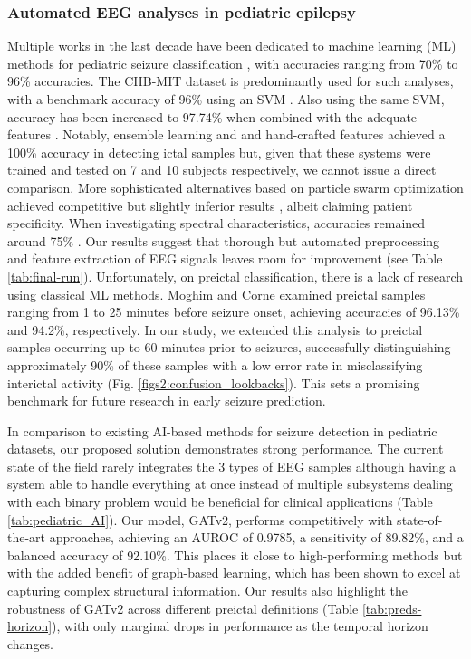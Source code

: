 \documentclass[a4paper,fleqn]{cas-sc}
\begin{document}
\subsubsection*{Automated EEG analyses in pediatric epilepsy}
Multiple works in the last decade have been dedicated to machine learning (ML) methods for pediatric seizure classification \cite{ahmed2022review}, with accuracies ranging from 70\% to 96\% accuracies. The CHB-MIT dataset is predominantly used for such analyses, with a benchmark accuracy of 96\% using an SVM \cite{shoeb2010applications}. Also using the same SVM, accuracy has been increased to 97.74\% when combined with the adequate features \cite{samiee2015features}. Notably, ensemble learning \cite{alotaibi2021ensemble} and and hand-crafted features\cite{khan2012automatic} achieved a 100\% accuracy in detecting ictal samples but, given that these systems were trained and tested on 7 and 10 subjects respectively, we cannot issue a direct comparison. More sophisticated alternatives based on particle swarm optimization achieved competitive but slightly inferior results \cite{kiranyaz2014swarm}, albeit claiming patient specificity. When investigating spectral characteristics, accuracies remained around 75\% \cite{ravish2012automated}. Our results suggest that thorough but automated preprocessing and feature extraction of EEG signals \cite{MazurekPreprocessing} leaves room for improvement (see Table \ref{tab:final-run}). Unfortunately, on preictal classification, there is a lack of research using classical ML methods. Moghim and Corne \cite{moghim2014predicting} examined preictal samples ranging from 1 to 25 minutes before seizure onset, achieving accuracies of 96.13\% and 94.2\%, respectively. In our study, we extended this analysis to preictal samples occurring up to 60 minutes prior to seizures, successfully distinguishing approximately 90\% of these samples with a low error rate in misclassifying interictal activity (Fig. \ref{figs2:confusion_lookbacks}). This sets a promising benchmark for future research in early seizure prediction.

In comparison to existing AI-based methods for seizure detection in pediatric datasets, our proposed solution demonstrates strong performance. The current state of the field rarely integrates the 3 types of EEG samples although having a system able to handle everything at once instead of multiple subsystems dealing with each binary problem would be beneficial for clinical applications (Table \ref{tab:pediatric_AI}). Our model, GATv2, performs competitively with state-of-the-art approaches, achieving an AUROC of 0.9785, a sensitivity of 89.82\%, and a balanced accuracy of 92.10\%. This places it close to high-performing methods but with the added benefit of graph-based learning, which has been shown to excel at capturing complex structural information. Our results also highlight the robustness of GATv2 across different preictal definitions (Table \ref{tab:preds-horizon}), with only marginal drops in performance as the temporal horizon changes.
\end{document}
